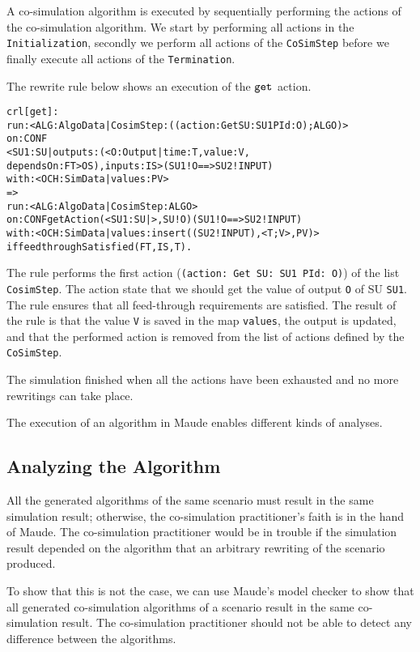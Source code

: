 A co-simulation algorithm is executed by sequentially performing the actions of the co-simulation algorithm.
We start by performing all actions in the \texttt{Initialization}, secondly we perform all actions of the \texttt{CoSimStep} before we finally execute all actions of the \texttt{Termination}. 

The rewrite rule below shows an execution of the $\mathtt{get}_{}$ action.
\small
\begin{alltt}
crl [get] : 
run: < ALG : AlgoData | CosimStep : ((action: Get SU: SU1 PId: O) ; ALGO) >
on: CONF
< SU1 : SU | outputs : (< O : Output | time : T, value : V, 
  dependsOn : FT > OS), inputs : IS > ( SU1 ! O ==> SU2 ! INPUT)
with: < OCH : SimData | values : PV >
=> 
run: < ALG : AlgoData | CosimStep : ALGO >
on: CONF getAction(< SU1 : SU | >, SU ! O) ( SU1 ! O ==> SU2 ! INPUT)
with: < OCH : SimData | values : insert((SU2 ! INPUT), < T ; V >, PV) > 
if feedthroughSatisfied(FT, IS, T) .
\end{alltt}
\normalsize
The rule performs the first action (\texttt{(action: Get SU: SU1 PId: O)}) of the list \texttt{CosimStep}.
The action state that we should get the value of output \texttt{O} of SU \texttt{SU1}.
The rule ensures that all feed-through requirements are satisfied.
The result of the rule is that the value \texttt{V} is saved in the map \texttt{values}, the output is updated, and that the performed action is removed from the list of actions defined by the \texttt{CoSimStep}.

The simulation finished when all the actions have been exhausted and no more rewritings can take place.

The execution of an algorithm in Maude enables different kinds of analyses.

\subsection{Analyzing the Algorithm}
All the generated algorithms of the same scenario must result in the same simulation result; otherwise, the co-simulation practitioner's faith is in the hand of Maude.
The co-simulation practitioner would be in trouble if the simulation result depended on the algorithm that an arbitrary rewriting of the scenario produced.

To show that this is not the case, we can use Maude's model checker to show that all generated co-simulation algorithms of a scenario result in the same co-simulation result.
The co-simulation practitioner should not be able to detect any difference between the algorithms.

